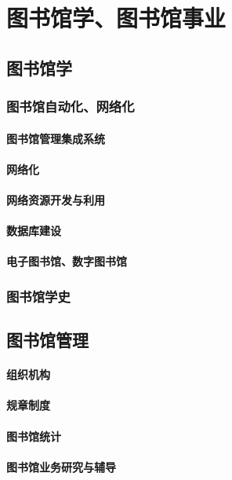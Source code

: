 \documentclass[UTF8]{../../ApplicationUniverse}
\begin{document}
\chapter{图书馆学、图书馆事业}
\section{图书馆学}
    \subsection{图书馆自动化、网络化}
        \subsubsection{图书馆管理集成系统}
        \subsubsection{网络化}
        \subsubsection{网络资源开发与利用}
        \subsubsection{数据库建设}
        \subsubsection{电子图书馆、数字图书馆}
    \subsection{图书馆学史}


\section{图书馆管理}
    \subsubsection{组织机构}
    \subsubsection{规章制度}
    \subsubsection{图书馆统计}
    \subsubsection{图书馆业务研究与辅导}
\end{document}
